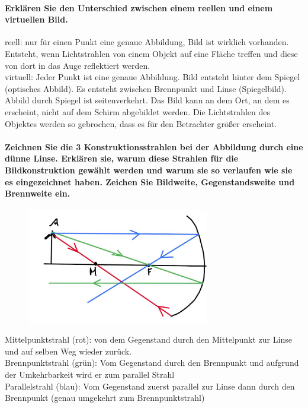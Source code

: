 \documentclass[a4paper, 11pt, ngerman, parskip=half-]{scrartcl}
\begin{document}
\paragraph{Erklären Sie den Unterschied zwischen einem reellen und einem virtuellen Bild.}

reell: nur für einen Punkt eine genaue Abbildung, Bild ist wirklich vorhanden. Entsteht, wenn Lichtstrahlen von einem Objekt auf eine Fläche treffen und diese von dort in das Auge reflektiert werden.\\
virtuell: Jeder Punkt ist eine genaue Abbildung. Bild entsteht hinter dem Spiegel (optisches Abbild). Es entsteht zwischen Brennpunkt und Linse (Spiegelbild).  Abbild durch Spiegel ist seitenverkehrt.  Das Bild kann an dem Ort, an dem es erscheint, nicht auf dem Schirm abgebildet werden. Die Lichtstrahlen des Objektes werden so gebrochen, dass es für den Betrachter größer erscheint.

\paragraph{Zeichnen Sie die 3 Konstruktionsstrahlen bei der Abbildung durch eine dünne Linse.
    Erklären sie, warum diese Strahlen für die Bildkonstruktion gewählt werden und warum sie so
    verlaufen wie sie es eingezeichnet haben. Zeichen Sie Bildweite, Gegenstandsweite und Brennweite
    ein.}

\begin{figure}[H]
    \centering
    \includegraphics[width=8cm]{image/17/geo14}
\end{figure}

Mittelpunktstrahl (rot): von dem Gegenstand durch den Mittelpunkt zur Linse und auf selben Weg wieder zurück.\\
Brennpunktstrahl (grün): Vom Gegenstand durch den Brennpunkt und aufgrund der Umkehrbarkeit wird er zum parallel Strahl\\
Parallelstrahl (blau): Vom Gegenstand zuerst parallel zur Linse dann durch den Brennpunkt (genau umgekehrt zum Brennpunktstrahl)
\end{document}
